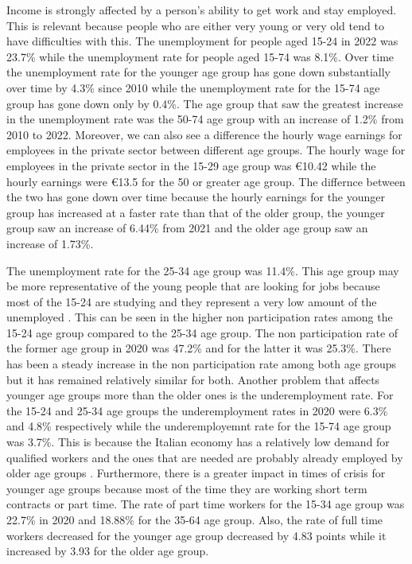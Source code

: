 \documentclass[12pt]{article}
\begin{document}
\begin{spacing}{1.5}

Income is strongly affected by a person's ability to get work and stay employed. This is relevant because people who are either very young or very old tend to have difficulties with this. The unemployment for people aged 15-24 in 2022 was 23.7\% while the unemployment rate for people aged 15-74 was 8.1\%. Over time the unemployment rate for the younger age group has gone down substantially over time by 4.3\% since 2010 while the unemployment rate for the 15-74 age group has gone down only by 0.4\%. The age group that saw the greatest increase in the unemployment rate was the 50-74 age group with an increase of 1.2\% from 2010 to 2022. Moreover, we can also see a difference the hourly wage earnings for employees in the private sector between different age groups. The hourly wage for employees in the private sector in the 15-29 age group was €10.42 while the hourly earnings were €13.5 for the 50 or greater age group. The differnce between the two has gone down over time because the hourly earnings for the younger group has increased at a faster rate than that of the older group, the younger group saw an increase of 6.44\% from 2021 and the older age group saw an increase of 1.73\%. 

The unemployment rate for the 25-34 age group was 11.4\%. This age group may be more representative of the young people that are looking for jobs because most of the 15-24 are studying and they represent a very low amount of the unemployed \cite{pontecorvo2018giovani}. This can be seen in the higher non participation rates among the 15-24 age group compared to the 25-34 age group. The non participation rate of the former age group in 2020 was 47.2\% and for the latter it was 25.3\%. There has been a steady increase in the non participation rate among both age groups but it has remained relatively similar for both. Another problem that affects younger age groups more than the older ones is the underemployment rate. For the 15-24 and 25-34 age groups the underemployment rates in 2020 were 6.3\% and 4.8\% respectively while the underemployemnt rate for the 15-74 age group was 3.7\%. This is because the Italian economy has a relatively low demand for qualified workers and the ones that are needed are probably already employed by older age groups \cite{pontecorvo2018giovani}. Furthermore, there is a greater impact in times of crisis for younger age groups because most of the time they are working short term contracts or part time. The rate of part time workers for the 15-34 age group was 22.7\% in 2020 and 18.88\% for the 35-64 age group. Also, the rate of full time workers decreased for the younger age group decreased by 4.83 points while it increased by 3.93 for the older age group.


\end{spacing}
\end{document}
